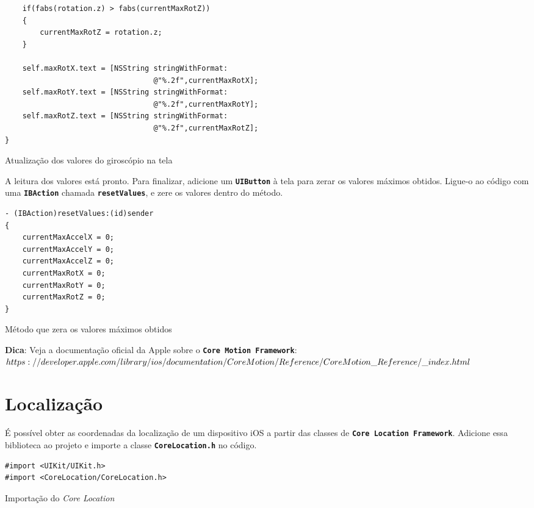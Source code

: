 \documentclass[a4paper,12pt,brazil,doubleside]{book}
\begin{document}
\begin{singlespace}
\begin{listing}[H]
\begin{verbatim}
    if(fabs(rotation.z) > fabs(currentMaxRotZ))
    {
        currentMaxRotZ = rotation.z;
    }
    
    self.maxRotX.text = [NSString stringWithFormat:
                                  @"%.2f",currentMaxRotX];
    self.maxRotY.text = [NSString stringWithFormat:
                                  @"%.2f",currentMaxRotY];
    self.maxRotZ.text = [NSString stringWithFormat:
                                  @"%.2f",currentMaxRotZ];
}
\end{verbatim}
\caption{Atualização dos valores do giroscópio na tela}
\end{listing}


A leitura dos valores está pronto. Para finalizar, adicione um \texttt{\textbf{UIButton}} à tela para zerar os valores máximos obtidos. Ligue-o ao código com uma \texttt{\textbf{IBAction}} chamada \texttt{\textbf{resetValues}}, e zere os valores dentro do método.

\begin{listing}[H]
\begin{verbatim}
- (IBAction)resetValues:(id)sender
{
    currentMaxAccelX = 0;
    currentMaxAccelY = 0;
    currentMaxAccelZ = 0;
    currentMaxRotX = 0;
    currentMaxRotY = 0;
    currentMaxRotZ = 0;
}
\end{verbatim}
\caption{Método que zera os valores máximos obtidos}
\end{listing}

\begin{framed}

\textbf{Dica}: Veja a documentação oficial da Apple sobre o \texttt{\textbf{Core Motion Framework}}:\\
\(https://developer.apple.com/library/ios/documentation/CoreMotion/Reference/\\CoreMotion\_Reference/\_index.html\)

\end{framed}

\section{Localização}


É possível obter as coordenadas da localização de um dispositivo iOS a partir das classes de \texttt{\textbf{Core Location Framework}}. Adicione essa biblioteca ao projeto e importe a classe \texttt{\textbf{CoreLocation.h}} no código.

\begin{listing}[H]
\begin{verbatim}
#import <UIKit/UIKit.h>
#import <CoreLocation/CoreLocation.h>
\end{verbatim}
\caption{Importação do \emph{Core Location}}
\end{listing}



\end{singlespace}
\end{document}
